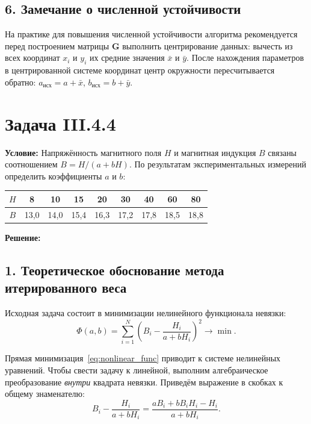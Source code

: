 \documentclass{article}
\begin{document}
\subsection*{6. Замечание о численной устойчивости}

На практике для повышения численной устойчивости алгоритма рекомендуется перед построением матрицы $\mathbf{G}$ выполнить центрирование данных: вычесть из всех координат $x_i$ и $y_i$ их средние значения $\bar{x}$ и $\bar{y}$. После нахождения параметров в центрированной системе координат центр окружности пересчитывается обратно: $a_{\text{исх}} = a + \bar{x}$, $b_{\text{исх}} = b + \bar{y}$.

\newpage



\section*{Задача III.4.4}

\textbf{Условие:} Напряжённость магнитного поля $H$ и магнитная индукция $B$ связаны соотношением $B = H/(a + bH)$. По результатам экспериментальных измерений определить коэффициенты $a$ и $b$:

\begin{center}
\begin{tabular}{|c|c|c|c|c|c|c|c|c|}
\hline
$H$ & 8 & 10 & 15 & 20 & 30 & 40 & 60 & 80 \\
\hline
$B$ & 13,0 & 14,0 & 15,4 & 16,3 & 17,2 & 17,8 & 18,5 & 18,8 \\
\hline
\end{tabular}
\end{center}

\vspace{0.5cm}
\textbf{Решение:}

\subsection*{1. Теоретическое обоснование метода итерированного веса}

Исходная задача состоит в минимизации нелинейного функционала невязки:
\begin{equation}
\Phi(a, b) = \sum_{i=1}^{N} \left(B_i - \frac{H_i}{a + bH_i}\right)^2 \to \min.
\label{eq:nonlinear_func}
\end{equation}

Прямая минимизация~\eqref{eq:nonlinear_func} приводит к системе нелинейных уравнений. Чтобы свести задачу к линейной, выполним алгебраическое преобразование \textit{внутри} квадрата невязки. Приведём выражение в скобках к общему знаменателю:
\begin{equation}
B_i - \frac{H_i}{a + bH_i} = \frac{aB_i + bB_iH_i - H_i}{a + bH_i}.
\end{equation}
\end{document}
